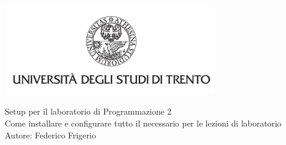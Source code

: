\begin{titlepage}
	\centering
    \graphicspath{{src/capitoli/01/img/}}
	\includegraphics[width=0.7\textwidth, keepaspectratio]{logo-unitn.png}

	\vspace{1.3cm}
	\Large{Setup per il laboratorio di Programmazione 2\\}
	\vspace{0.4cm}
	\small{Come installare e configurare tutto il necessario per le lezioni di laboratorio}\\
	\vspace{0.3cm}
	\small{Autore: Federico Frigerio}
\end{titlepage}
